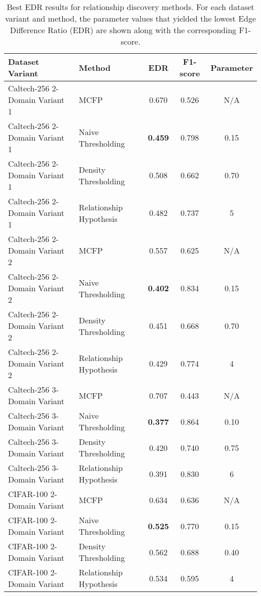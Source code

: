 \begin{table}[ht]
\centering
\caption{Best EDR results for relationship discovery methods. For each dataset variant and method, the parameter values that yielded the lowest Edge Difference Ratio (EDR) are shown along with the corresponding F1-score.}
\label{tab:relationship_methods_best_edr}
\begin{tabular}{llccc}
\toprule
Dataset Variant & Method & EDR & F1-score & Parameter \\
\midrule
Caltech-256 2-Domain Variant 1 & MCFP & 0.670 & 0.526 & N/A \\
Caltech-256 2-Domain Variant 1 & Naive Thresholding & \textbf{0.459} & 0.798 & 0.15 \\
Caltech-256 2-Domain Variant 1 & Density Thresholding & 0.508 & 0.662 & 0.70 \\
Caltech-256 2-Domain Variant 1 & Relationship Hypothesis & 0.482 & 0.737 & 5 \\
\hline
Caltech-256 2-Domain Variant 2 & MCFP & 0.557 & 0.625 & N/A \\
Caltech-256 2-Domain Variant 2 & Naive Thresholding & \textbf{0.402} & 0.834 & 0.15 \\
Caltech-256 2-Domain Variant 2 & Density Thresholding & 0.451 & 0.668 & 0.70 \\
Caltech-256 2-Domain Variant 2 & Relationship Hypothesis & 0.429 & 0.774 & 4 \\
\hline
Caltech-256 3-Domain Variant & MCFP & 0.707 & 0.443 & N/A \\
Caltech-256 3-Domain Variant & Naive Thresholding & \textbf{0.377} & 0.864 & 0.10 \\
Caltech-256 3-Domain Variant & Density Thresholding & 0.420 & 0.740 & 0.75 \\
Caltech-256 3-Domain Variant & Relationship Hypothesis & 0.391 & 0.830 & 6 \\
\hline
CIFAR-100 2-Domain Variant & MCFP & 0.634 & 0.636 & N/A \\
CIFAR-100 2-Domain Variant & Naive Thresholding & \textbf{0.525} & 0.770 & 0.15 \\
CIFAR-100 2-Domain Variant & Density Thresholding & 0.562 & 0.688 & 0.40 \\
CIFAR-100 2-Domain Variant & Relationship Hypothesis & 0.534 & 0.595 & 4 \\
\bottomrule
\end{tabular}
\end{table}
